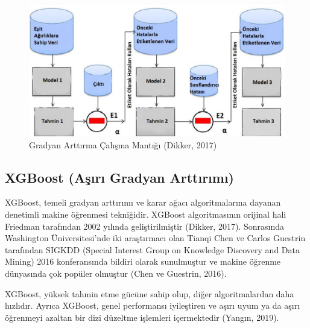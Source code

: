 \documentclass[12pt,twoside]{deuthesis}
\begin{document}
\begin{figure}

{\centering \includegraphics[width=1\linewidth,height=0.4\textheight]{figure/gb-dixit} 

}

\caption{Gradyan Arttırma Çalışma Mantığı (Dikker, 2017)}\label{fig:unnamed-chunk-8}
\end{figure}
\hypertarget{xgboost-aux15fux131rux131-gradyan-arttux131rux131mux131}{%
\subsection{XGBoost (Aşırı Gradyan Arttırımı)}\label{xgboost-aux15fux131rux131-gradyan-arttux131rux131mux131}}

XGBoost, temeli gradyan arttırımı ve karar ağacı algoritmalarına dayanan denetimli makine öğrenmesi tekniğidir.
XGBoost algoritmasının orijinal hali Friedman tarafından 2002 yılında geliştirilmiştir (Dikker, 2017). Sonrasında Washington Üniversitesi'nde iki araştırmacı olan Tianqi Chen ve Carlos Guestrin tarafından SIGKDD (Special Interest Group on Knowledge Discovery and Data Mining) 2016 konferansında bildiri olarak sunulmuştur ve makine öğrenme dünyasında çok popüler olmuştur (Chen ve Guestrin, 2016).

XGBoost, yüksek tahmin etme gücüne sahip olup, diğer algoritmalardan daha hızlıdır. Ayrıca XGBoost, genel performansı iyileştiren ve aşırı uyum ya da aşırı öğrenmeyi azaltan bir dizi düzeltme işlemleri içermektedir (Yangın, 2019).
\end{document}
